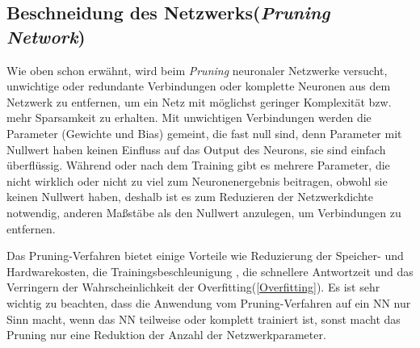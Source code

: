 \documentclass[12pt,a4paper]{scrartcl}
\numberwithin{equation}{section}
\begin{document}
\subsection{Beschneidung des Netzwerks(\textit{Pruning Network})}\label{kom:pruning}
Wie oben schon erwähnt, wird beim \textit{Pruning} neuronaler Netzwerke versucht, unwichtige oder redundante Verbindungen oder komplette Neuronen aus dem Netzwerk zu entfernen, um ein Netz mit möglichst geringer Komplexität bzw. mehr Sparsamkeit zu erhalten. Mit unwichtigen Verbindungen werden die Parameter (Gewichte und Bias) gemeint, die fast null sind, denn Parameter mit Nullwert haben keinen Einfluss auf das Output des Neurons, sie sind einfach überflüssig. Während oder nach dem Training gibt es mehrere Parameter, die nicht wirklich oder nicht zu viel zum Neuronenergebnis beitragen, obwohl sie keinen Nullwert haben, deshalb ist es zum Reduzieren der Netzwerkdichte notwendig, anderen Maßstäbe als den Nullwert anzulegen, um Verbindungen zu entfernen.

Das Pruning-Verfahren bietet einige Vorteile wie Reduzierung der Speicher- und Hardwarekosten, die Trainingsbeschleunigung , die schnellere Antwortzeit und das Verringern der Wahrscheinlichkeit der Overfitting(\ref{Overfitting}).
Es ist sehr wichtig zu beachten, dass die Anwendung vom Pruning-Verfahren auf ein \ac{NN} nur Sinn macht, wenn das \ac{NN} teilweise oder komplett trainiert ist, sonst macht das Pruning nur eine Reduktion der Anzahl der Netzwerkparameter.
\end{document}
